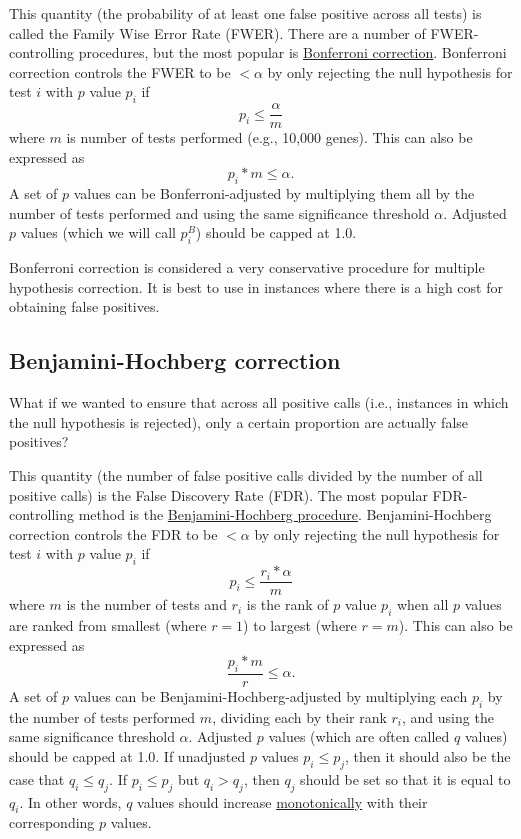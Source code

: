 \documentclass[letterpaper, 12pt]{article}
\begin{document}
This quantity (the probability of at least one false positive across all tests) is called the Family Wise Error Rate (FWER). There are a number of FWER-controlling procedures, but the most popular is \href{https://en.wikipedia.org/wiki/Bonferroni_correction}{Bonferroni correction}. Bonferroni correction controls the FWER to be $< \alpha$ by only rejecting the null hypothesis for test $i$ with $p$ value $p_i$ if
$$p_i \leq \frac{\alpha}{m}$$
where $m$ is number of tests performed (e.g., 10,000 genes). This can also be expressed as
$$p_i * m \leq \alpha.$$
A set of $p$ values can be Bonferroni-adjusted by multiplying them all by the number of tests performed and using the same significance threshold $\alpha$. Adjusted $p$ values (which we will call $p_i^{B}$) should be capped at 1.0.

Bonferroni correction is considered a very conservative procedure for multiple hypothesis correction. It is best to use in instances where there is a high cost for obtaining false positives.

\subsection*{Benjamini-Hochberg correction}

What if we wanted to ensure that across all positive calls (i.e., instances in which the null hypothesis is rejected), only a certain proportion are actually false positives?

This quantity (the number of false positive calls divided by the number of all positive calls) is the False Discovery Rate (FDR). The most popular FDR-controlling method is the \href{https://doi.org/10.1111/j.2517-6161.1995.tb02031.x}{Benjamini-Hochberg procedure}. Benjamini-Hochberg correction controls the FDR to be $< \alpha$ by only rejecting the null hypothesis for test $i$ with $p$ value $p_i$ if
$$p_i \leq \frac{r_i * \alpha}{m}$$
where $m$ is the number of tests and $r_i$ is the rank of $p$ value $p_i$ when all $p$ values are ranked from smallest (where $r = 1$) to largest (where $r = m$). This can also be expressed as
$$\frac{p_i * m}{r} \leq \alpha.$$
A set of $p$ values can be Benjamini-Hochberg-adjusted by multiplying each $p_i$ by the number of tests performed $m$, dividing each by their rank $r_i$, and using the same significance threshold $\alpha$. Adjusted $p$ values (which are often called $q$ values) should be capped at 1.0. If unadjusted $p$ values $p_i \leq p_j$, then it should also be the case that $q_i \leq q_j$. If $p_i \leq p_j$ but $q_i > q_j$, then $q_j$ should be set so that it is equal to $q_i$. In other words, $q$ values should increase \href{https://en.wikipedia.org/wiki/Monotonic_function}{monotonically} with their corresponding $p$ values.
\end{document}
